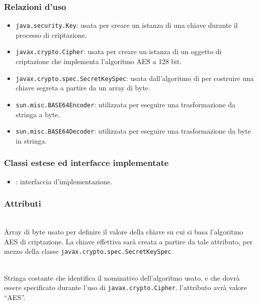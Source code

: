 \subsubsection*{Relazioni d'uso}
\begin{itemize}
	\item \texttt{java.security.Key}: usata per creare un istanza di una chiave durante il processo di criptazione.
	\item \texttt{javax.crypto.Cipher}: usata per creare un istanza di un oggetto di criptazione che implementa l'algoritmo AES a 128 bit.
	\item \texttt{javax.crypto.spec.SecretKeySpec}: usata dall'algoritmo di per costruire una chiave segreta a partire da un array di byte.
	\item \texttt{sun.misc.BASE64Encoder}: utilizzata per eseguire una trasformazione da stringa a byte.
	\item \texttt{sun.misc.BASE64Decoder}: utilizzata per eseguire una trasformazione da byte in stringa.
\end{itemize}

\subsubsection*{Classi estese ed interfacce implementate}
\begin{itemize}
	\item {}: interfaccia d'implementazione.
\end{itemize}

\subsubsection*{Attributi}
\begin{description}
  \item{}\\
  Array di byte usato per definire il valore della chiave su cui si basa l'algoritmo AES di criptazione. La chiave effettiva sarà creata a partire da tale attributo, per mezzo della classe \texttt{javax.crypto.spec.SecretKeySpec}.
  \item{}\\
  Stringa costante che identifica il nominativo dell'algoritmo usato, e che dovrà essere specificato durante l'uso di \texttt{javax.crypto.Cipher}. l'attributo avrà valore ``AES''.
\end{description}

